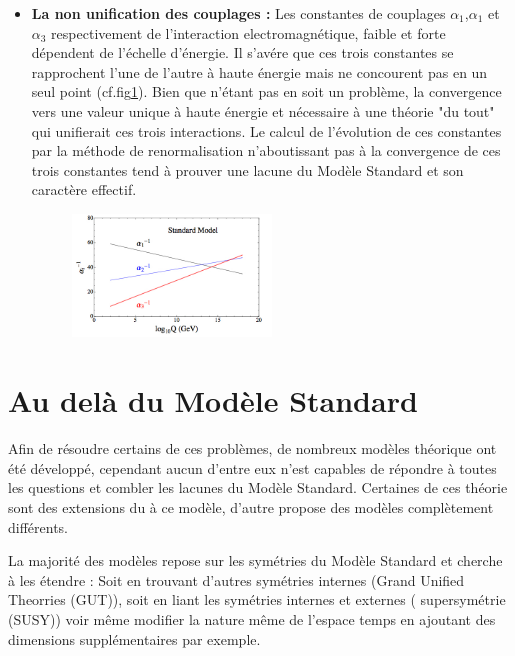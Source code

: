 \begin{itemize}[label=$\bullet$]
\item \textbf{La non unification des couplages : }Les constantes de couplages $\alpha_{1}$,$\alpha_{1}$ et $\alpha_{3}$ respectivement de l'interaction electromagnétique, faible et forte dépendent de l'échelle d'énergie. Il s'avére que ces trois constantes se rapprochent l'une de l'autre à haute énergie mais ne concourent pas en un seul point (cf.fig\ref{constantes}). Bien que n'étant pas en soit un problème, la convergence vers une valeur unique à haute énergie et nécessaire à une théorie "du tout" qui unifierait ces trois interactions. Le calcul de l'évolution de ces constantes par la méthode de renormalisation n'aboutissant pas à la convergence de ces trois constantes tend à prouver une lacune du Modèle Standard et son caractère effectif.
\begin{figure}[h!]
\centering
\includegraphics[width=0.50\textwidth]{SM/couplageSM.jpg}
\label{constantes}
\end{figure}
\end{itemize}

\section{Au delà du Modèle Standard}
Afin de résoudre certains de ces problèmes, de nombreux modèles théorique ont été développé, cependant aucun d'entre eux n'est capables de répondre à toutes les questions et combler les lacunes du Modèle Standard. Certaines de ces théorie sont des extensions du à ce modèle, d'autre propose des modèles complètement différents.

La majorité des modèles repose sur les symétries du Modèle Standard et cherche à les étendre : Soit en trouvant d'autres symétries internes (Grand Unified Theorries (GUT)), soit en liant les symétries internes et externes ( supersymétrie (SUSY)) voir même modifier la nature même de l'espace temps en ajoutant des dimensions supplémentaires par exemple.

